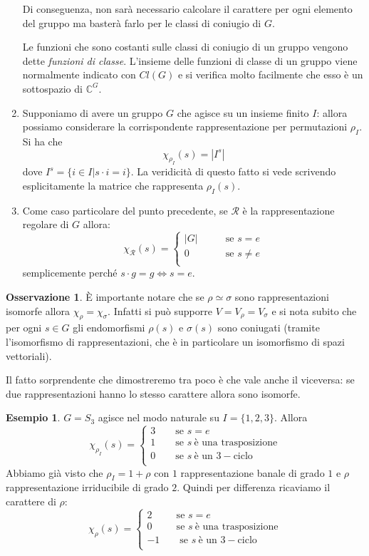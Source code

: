 \documentclass[11pt]{article}
\theoremstyle{plain}
\theoremstyle{definition}
\newtheorem{exmp}{Esempio}[section]
\newtheorem*{rem}{Osservazione}
\theoremstyle{remark}
\DeclareMathOperator{\iso}{\simeq}
\begin{document}
\begin{enumerate}
Di conseguenza, non sarà necessario calcolare il carattere per ogni elemento del gruppo ma basterà farlo per le classi di coniugio di $G$.

Le funzioni che sono costanti sulle classi di coniugio di un gruppo vengono dette \emph{funzioni di classe}.
L'insieme delle funzioni di classe di un gruppo viene normalmente indicato con $Cl(G)$ e si verifica molto facilmente che esso è un sottospazio di $\mathbb{C}^G$.
	\item Supponiamo di avere un gruppo $G$ che agisce su un insieme finito $I$: allora possiamo considerare la corrispondente
	rappresentazione per permutazioni $\rho_I$. Si ha che
	$$\chi_{\rho_{I}}(s) =  |I^s|$$
	dove $I^s=\{i\in I| s\cdot i=i\}$. La veridicità di questo fatto si vede scrivendo esplicitamente la matrice che rappresenta $\rho_I(s)$.
	\item Come caso particolare del punto precedente, se $\mathcal{R}$ è la rappresentazione regolare di $G$ allora:
	\[ \chi_{\mathcal{R}}(s) = \begin{cases}
|G| \qquad &\text{se } s=e \\
0 \qquad &\text{se } s\neq e\\
\end{cases} \]
semplicemente perché $s\cdot g=g\Leftrightarrow s=e$.
\end{enumerate}

\begin{rem}
\`E importante notare che se $\rho\iso\sigma$ sono rappresentazioni isomorfe allora $\chi_\rho = \chi_\sigma$.
Infatti si può supporre $V = V_\rho = V_\sigma$ e si nota subito che per ogni $s\in G$ gli endomorfismi $\rho(s)$ e $\sigma(s)$ sono
coniugati (tramite l'isomorfismo di rappresentazioni, che è in particolare un isomorfismo di spazi vettoriali).

Il fatto sorprendente che dimostreremo tra poco è che vale anche il viceversa: se due rappresentazioni hanno lo stesso carattere allora sono isomorfe.
\end{rem}

\begin{exmp}
$G=S_3$ agisce nel modo naturale su $I=\{1,2,3\}$. Allora
\[ \chi_{\rho_I}(s) = \begin{cases}
3 \qquad \text{se } s=e \\
1 \qquad \text{se } s\ \text{è una trasposizione}\\
0 \qquad \text{se } s\ \text{è un } 3-\text{ciclo}\\
\end{cases} \]
Abbiamo già visto che $\rho_I = 1 + \rho$ con $1$ rappresentazione banale di grado $1$ e $\rho$ rappresentazione irriducibile di grado $2$.
Quindi per differenza ricaviamo il carattere di $\rho$:
\[ \chi_{\rho}(s) = \begin{cases}
2 \qquad \ \ \text{se } s=e \\
0 \qquad \ \ \text{se } s\ \text{è una trasposizione}\\
-1\qquad \text{se } s\ \text{è un } 3-\text{ciclo}\\
\end{cases} \]
\end{exmp}
\end{document}
